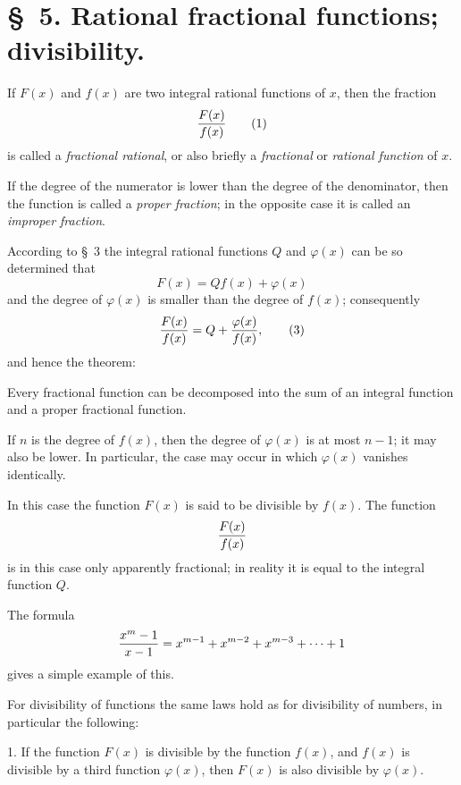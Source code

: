 \documentclass[11pt]{article}
\begin{document}
\clearpage
\clearpage

\section*{\S~5. Rational fractional functions; divisibility.}

If $F(x)$ and $f(x)$ are two integral rational functions of $x$, then the fraction
\begin{equation}
 {F(x)\over f(x)}
\tag{1}
\end{equation}
is called a \emph{fractional rational}, or also briefly a \emph{fractional} or \emph{rational function} of $x$.

If the degree of the numerator is lower than the degree of the denominator, then the function is called a \emph{proper fraction}; in the opposite case it is called an \emph{improper fraction}.

According to \S~3 the integral rational functions $Q$ and $\varphi(x)$ can be so determined that
\begin{equation}
 F(x)=Qf(x)+\varphi(x)
\tag{2}
\end{equation}
and the degree of $\varphi(x)$ is smaller than the degree of $f(x)$; consequently
\begin{equation}
 {F(x)\over f(x)}=Q+{\varphi(x)\over f(x)},
\tag{3}
\end{equation}
and hence the theorem:

Every fractional function can be decomposed into the sum of an integral function and a proper fractional function.

If $n$ is the degree of $f(x)$, then the degree of $\varphi(x)$ is at most $n-1$; it may also be lower. In particular, the case may occur in which $\varphi(x)$ vanishes identically.

In this case the function $F(x)$ is said to be divisible by $f(x)$. The function
\[
 {F(x)\over f(x)}
\]
is in this case only apparently fractional; in reality it is equal to the integral function $Q$.

The formula
\[
 {x^m-1\over x-1}=x^{m-1}+x^{m-2}+x^{m-3}+\cdots+1
\]
gives a simple example of this.

For divisibility of functions the same laws hold as for divisibility of numbers, in particular the following:

1. If the function $F(x)$ is divisible by the function $f(x)$, and $f(x)$ is divisible by a third function $\varphi(x)$, then $F(x)$ is also divisible by $\varphi(x)$.
\end{document}

